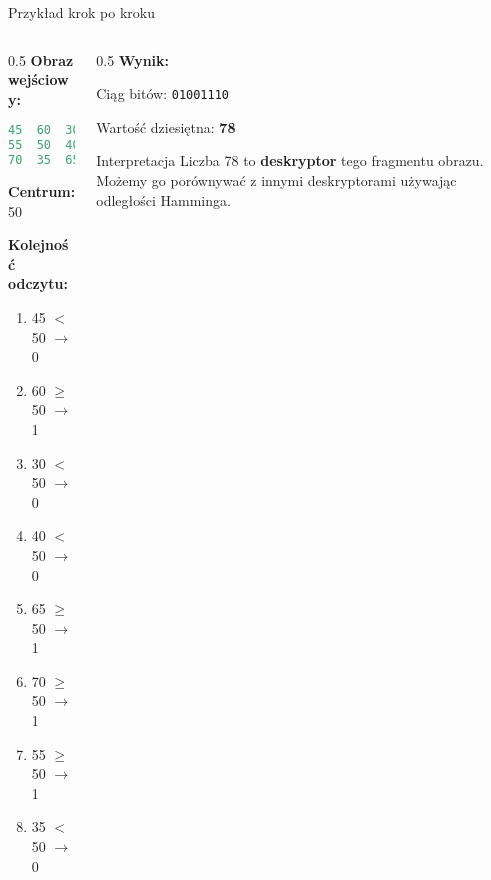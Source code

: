 \documentclass[9pt]{beamer}
\begin{document}
\begin{frame}[fragile]{Przykład krok po kroku}
\begin{columns}
\begin{column}{0.5\textwidth}
\textbf{Obraz wejściowy:}
\begin{lstlisting}[language=Python, basicstyle=\tiny\ttfamily]
45  60  30
55  50  40
70  35  65
\end{lstlisting}

\vspace{3mm}

\textbf{Centrum:} 50

\vspace{3mm}

\textbf{Kolejność odczytu:}
\begin{enumerate}
\footnotesize
\item 45 $<$ 50 $\rightarrow$ 0
\item 60 $\geq$ 50 $\rightarrow$ 1
\item 30 $<$ 50 $\rightarrow$ 0
\item 40 $<$ 50 $\rightarrow$ 0
\item 65 $\geq$ 50 $\rightarrow$ 1
\item 70 $\geq$ 50 $\rightarrow$ 1
\item 55 $\geq$ 50 $\rightarrow$ 1
\item 35 $<$ 50 $\rightarrow$ 0
\end{enumerate}
\end{column}
\begin{column}{0.5\textwidth}
\textbf{Wynik:}

\vspace{3mm}

Ciąg bitów: \texttt{01001110}

\vspace{3mm}

Wartość dziesiętna: \textbf{78}

\vspace{5mm}

\begin{alertblock}{Interpretacja}
Liczba 78 to \textbf{deskryptor} tego fragmentu obrazu. Możemy go porównywać z innymi deskryptorami używając odległości Hamminga.
\end{alertblock}
\end{column}
\end{columns}

\end{frame}
\end{document}
